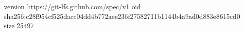 version https://git-lfs.github.com/spec/v1
oid sha256:c28f954cf525dacc04dd4b772aee236f27582711b1144b4a9ad0d883e8615cd0
size 25497
